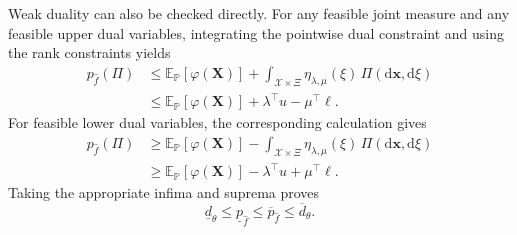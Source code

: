 \documentclass[review,11pt,3p,authoryear,nopreprintline]{elsarticle}
\begin{document}
Weak duality can also be checked directly. For any feasible joint measure and any feasible upper dual variables, integrating the pointwise dual constraint and using the rank constraints yields
\[
  \begin{aligned}
    p_{\hat f}(\Pi)
    &\le\mathbb E_{\mathbb P}\left[\varphi(\bm X)\right]
    +\int_{\mathcal X\times\Xi}\eta_{\lambda,\mu}(\xi)\,\Pi\left(\mathrm d\bm x,\mathrm d\xi\right)\\
    &\le\mathbb E_{\mathbb P}\left[\varphi(\bm X)\right]+\lambda^\top u-\mu^\top\ell.
  \end{aligned}
\]
For feasible lower dual variables, the corresponding calculation gives
\[
  \begin{aligned}
    p_{\hat f}(\Pi)
    &\ge\mathbb E_{\mathbb P}\left[\varphi(\bm X)\right]
    -\int_{\mathcal X\times\Xi}\eta_{\lambda,\mu}(\xi)\,\Pi\left(\mathrm d\bm x,\mathrm d\xi\right)\\
    &\ge\mathbb E_{\mathbb P}\left[\varphi(\bm X)\right]-\lambda^\top u+\mu^\top\ell.
  \end{aligned}
\]
Taking the appropriate infima and suprema proves
\begin{equation}
  \underline d_\theta\le\underline p_{\hat f}\le\overline p_{\hat f}\le\overline d_\theta.
  \label{eq-weak-duality}
\end{equation}
\end{document}
